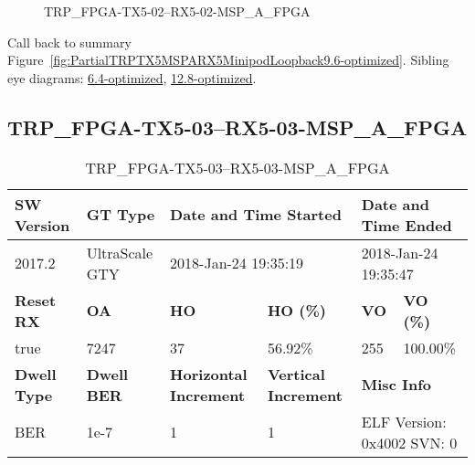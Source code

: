 \begin{figure}[h]
\caption{TRP\_FPGA-TX5-02--RX5-02-MSP\_A\_FPGA} \label{fig:TRPFPGATX502RX502MSPAFPGA9.6-optimized}
\end{figure}

Call back to summary Figure~\ref{fig:PartialTRPTX5MSPARX5MinipodLoopback9.6-optimized}.
Sibling eye diagrams: \hyperref[sec:TRPFPGATX502RX502MSPAFPGA6.4-optimized]{6.4-optimized}, \hyperref[sec:TRPFPGATX502RX502MSPAFPGA12.8-optimized]{12.8-optimized}.

\clearpage
\newpage


\subsection{TRP\_FPGA-TX5-03--RX5-03-MSP\_A\_FPGA}\label{sec:TRPFPGATX503RX503MSPAFPGA9.6-optimized}

\begin{table}[h]
\centering
\caption{TRP\_FPGA-TX5-03--RX5-03-MSP\_A\_FPGA}
\label{tab:TRPFPGATX503RX503MSPAFPGA9.6-optimized}
\begin{tabular}{@{}|l|l|l|l|l|l|@{}}
\toprule
\textbf{SW Version}                & \textbf{GT Type}   & \multicolumn{2}{l|}{\textbf{Date and Time Started}}            & \multicolumn{2}{l|}{\textbf{Date and Time Ended}}        \\ \midrule
2017.2                       & UltraScale GTY          & \multicolumn{2}{l|}{2018-Jan-24 19:35:19}                   & \multicolumn{2}{l|}{2018-Jan-24 19:35:47}               \\ \midrule
\textbf{Reset RX}                  & \textbf{OA} & \textbf{HO}   & \textbf{HO (\%)} & \textbf{VO} & \textbf{VO (\%)} \\ \midrule
true & 7247        & 37          & 56.92\%        & 255        & 100.00\%       \\ \midrule
\textbf{Dwell Type}                & \textbf{Dwell BER} & \textbf{Horizontal Increment} & \textbf{Vertical Increment}    & \multicolumn{2}{l|}{\textbf{Misc Info}}                  \\ \midrule
BER                            & 1e-7        & 1        & 1           & \multicolumn{2}{l|}{ELF Version: 0x4002 SVN: 0}                         \\ \bottomrule
\end{tabular}
\end{table}

